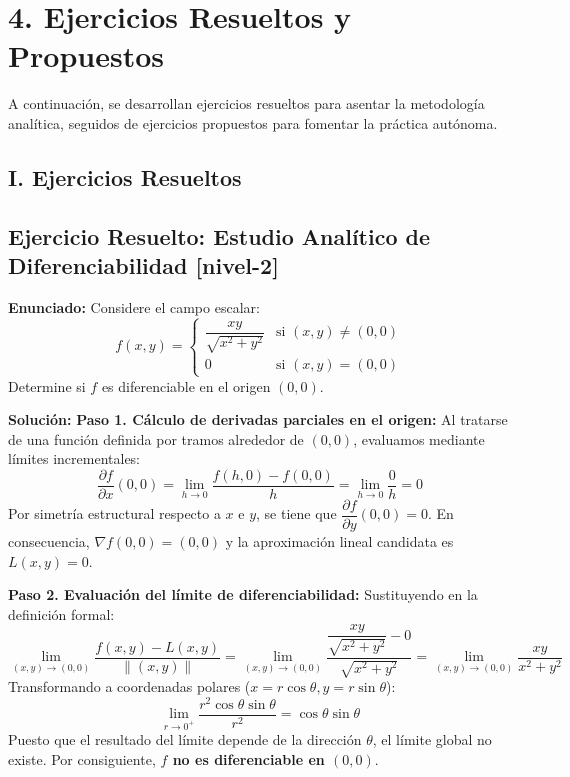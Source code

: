 \documentclass[11pt]{article}
\newenvironment{ejercicios}{%
  \section*{4. Ejercicios Resueltos y Propuestos}%
}{}
\newenvironment{ejercicioresuelto}[2]{\subsection*{Ejercicio Resuelto: #1 \small{[#2]}}}{}
\newcommand{\enunciado}[1]{\textbf{Enunciado:} #1\par\vspace{0.2cm}}
\newcommand{\solucion}[1]{\textbf{Solución:} #1\par\vspace{0.4cm}}
\begin{document}
\begin{ejercicios}
  A continuación, se desarrollan ejercicios resueltos para asentar la metodología analítica, seguidos de ejercicios propuestos para fomentar la práctica autónoma.

  \subsection*{I. Ejercicios Resueltos}

  \begin{ejercicioresuelto}{Estudio Analítico de Diferenciabilidad}{nivel-2}
    \enunciado{
      Considere el campo escalar:
      $$ f(x,y) = \begin{cases} \dfrac{xy}{\sqrt{x^2 + y^2}} & \text{si } (x,y) \neq (0,0) \\[1em] 0 & \text{si } (x,y) = (0,0) \end{cases} $$
      Determine si $f$ es diferenciable en el origen $(0,0)$.
    }
    \solucion{
      \textbf{Paso 1. Cálculo de derivadas parciales en el origen:}
      Al tratarse de una función definida por tramos alrededor de $(0,0)$, evaluamos mediante límites incrementales:
      $$ \dfrac{\partial f}{\partial x}(0,0) = \lim\limits_{h \to 0} \dfrac{f(h,0) - f(0,0)}{h} = \lim\limits_{h \to 0} \dfrac{0}{h} = 0 $$
      Por simetría estructural respecto a $x$ e $y$, se tiene que $\dfrac{\partial f}{\partial y}(0,0) = 0$.
      En consecuencia, $\nabla f(0,0) = (0,0)$ y la aproximación lineal candidata es $L(x,y) = 0$.

      \vspace{0.2cm}
      \textbf{Paso 2. Evaluación del límite de diferenciabilidad:}
      Sustituyendo en la definición formal:
      $$ \lim\limits_{(x,y) \to (0,0)} \dfrac{f(x,y) - L(x,y)}{\| (x,y) \|} = \lim\limits_{(x,y) \to (0,0)} \dfrac{\dfrac{xy}{\sqrt{x^2 + y^2}} - 0}{\sqrt{x^2 + y^2}} = \lim\limits_{(x,y) \to (0,0)} \dfrac{xy}{x^2 + y^2} $$
      Transformando a coordenadas polares ($x=r\cos\theta, y=r\sin\theta$):
      $$ \lim\limits_{r \to 0^+} \dfrac{r^2\cos\theta \sin\theta}{r^2} = \cos\theta \sin\theta $$
      Puesto que el resultado del límite depende de la dirección $\theta$, el límite global no existe. Por consiguiente, \textbf{$f$ no es diferenciable en $(0,0)$}.
    }
  \end{ejercicioresuelto}


\end{ejercicios}
\end{document}
